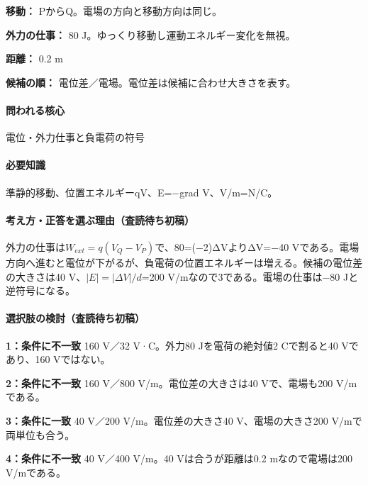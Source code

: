 \noindent\textbf{移動：} PからQ。電場の方向と移動方向は同じ。\par

\noindent\textbf{外力の仕事：} 80 J。ゆっくり移動し運動エネルギー変化を無視。\par

\noindent\textbf{距離：} 0.2 m\par

\noindent\textbf{候補の順：} 電位差／電場。電位差は候補に合わせ大きさを表す。\par

\paragraph{問われる核心} 電位・外力仕事と負電荷の符号

\paragraph{必要知識} 準静的移動、位置エネルギーqV、E=−grad V、V/m=\allowbreak{}N/C。

\paragraph{考え方・正答を選ぶ理由（査読待ち初稿）} 外力の仕事は\(W_{ext}=q(V_Q-V_P)\)で、80=\allowbreak{}(−2)ΔVよりΔV=−40 Vである。電場方向へ進むと電位が下がるが、負電荷の位置エネルギーは増える。候補の電位差の大きさは40 V、\(|E|=|\Delta V|/d\)=200 V/mなので3である。電場の仕事は−80 Jと逆符号になる。

\paragraph{選択肢の検討（査読待ち初稿）}\mbox{}\par

\noindent\textbf{1：条件に不一致} 160 V／32 V·C。外力80 Jを電荷の絶対値2 Cで割ると40 Vであり、160 Vではない。\par

\noindent\textbf{2：条件に不一致} 160 V／800 V/m。電位差の大きさは40 Vで、電場も200 V/mである。\par

\noindent\textbf{3：条件に一致} 40 V／200 V/m。電位差の大きさ40 V、電場の大きさ200 V/mで両単位も合う。\par

\noindent\textbf{4：条件に不一致} 40 V／400 V/m。40 Vは合うが距離は0.2 mなので電場は200 V/mである。\par

